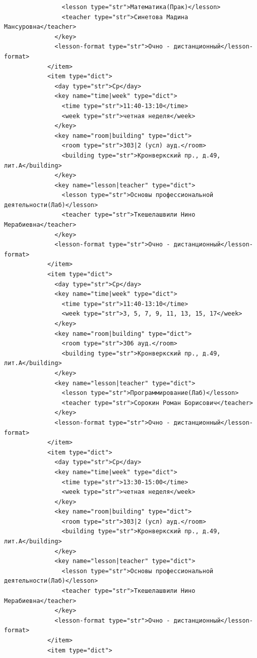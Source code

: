\documentclass[12pt,onecolumn]{article}
\begin{document}
\begin{flushleft}
\begin{verbatim}
                <lesson type="str">Математика(Прак)</lesson>
                <teacher type="str">Синетова Мадина Мансуровна</teacher>
              </key>
              <lesson-format type="str">Очно - дистанционный</lesson-format>
            </item>
            <item type="dict">
              <day type="str">Ср</day>
              <key name="time|week" type="dict">
                <time type="str">11:40-13:10</time>
                <week type="str">четная неделя</week>
              </key>
              <key name="room|building" type="dict">
                <room type="str">303|2 (усл) ауд.</room>
                <building type="str">Кронверкский пр., д.49, лит.А</building>
              </key>
              <key name="lesson|teacher" type="dict">
                <lesson type="str">Основы профессиональной деятельности(Лаб)</lesson>
                <teacher type="str">Ткешелашвили Нино Мерабиевна</teacher>
              </key>
              <lesson-format type="str">Очно - дистанционный</lesson-format>
            </item>
            <item type="dict">
              <day type="str">Ср</day>
              <key name="time|week" type="dict">
                <time type="str">11:40-13:10</time>
                <week type="str">3, 5, 7, 9, 11, 13, 15, 17</week>
              </key>
              <key name="room|building" type="dict">
                <room type="str">306 ауд.</room>
                <building type="str">Кронверкский пр., д.49, лит.А</building>
              </key>
              <key name="lesson|teacher" type="dict">
                <lesson type="str">Программирование(Лаб)</lesson>
                <teacher type="str">Сорокин Роман Борисович</teacher>
              </key>
              <lesson-format type="str">Очно - дистанционный</lesson-format>
            </item>
            <item type="dict">
              <day type="str">Ср</day>
              <key name="time|week" type="dict">
                <time type="str">13:30-15:00</time>
                <week type="str">четная неделя</week>
              </key>
              <key name="room|building" type="dict">
                <room type="str">303|2 (усл) ауд.</room>
                <building type="str">Кронверкский пр., д.49, лит.А</building>
              </key>
              <key name="lesson|teacher" type="dict">
                <lesson type="str">Основы профессиональной деятельности(Лаб)</lesson>
                <teacher type="str">Ткешелашвили Нино Мерабиевна</teacher>
              </key>
              <lesson-format type="str">Очно - дистанционный</lesson-format>
            </item>
            <item type="dict">

\end{verbatim}
\end{flushleft}
\end{document}
